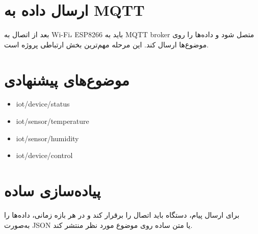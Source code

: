 \section{ارسال داده به MQTT}

بعد از اتصال به Wi-Fi، ESP8266 باید به MQTT broker متصل شود و داده‌ها را روی موضوع‌ها ارسال کند. این مرحله مهم‌ترین بخش ارتباطی پروژه است.

\section{موضوع‌های پیشنهادی}

\begin{itemize}
    \item iot/device/status
    \item iot/sensor/temperature
    \item iot/sensor/humidity
    \item iot/device/control
\end{itemize}

\section{پیاده‌سازی ساده}

برای ارسال پیام، دستگاه باید اتصال را برقرار کند و در هر بازه زمانی، داده‌ها را به‌صورت JSON یا متن ساده روی موضوع مورد نظر منتشر کند.
